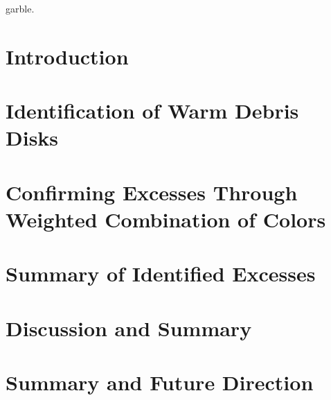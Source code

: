 \documentclass[phd,bottom,nosig]{usbthesis}
\begin{document}
\begin{dedication}
   garble.
\end{dedication}

\tableofcontents %
\listoffigures %
\listoftables %

\begin{acknowledgements}
%   
\end{acknowledgements}

\pagestyle{thesis}



\newpage
{}

\chapter{Introduction} \label{chap:intro}


\chapter{Identification of Warm Debris Disks} \label{chap:iddisks}

\clearpage
{}



\chapter{Confirming Excesses Through Weighted Combination of Colors}\label{chap:confirm}

\chapter{Summary of Identified Excesses} \label{chap:summary}

\chapter{Discussion and Summary} \label{chap:disc_and_summary}

\chapter{Summary and Future Direction} \label{chap:future}




%


%
\end{document}
